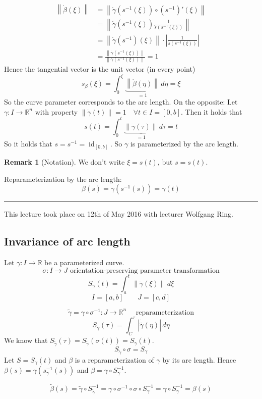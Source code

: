 \documentclass[a4paper,landscape,twocolumn]{article}
\theoremstyle{definition}
\newtheorem{rem}{Remark}
\newcommand\abs[1]{\left|#1\right|}
\newcommand\meta[3]{\hrule{} This #1 took place on #2 with lecturer #3.\par}
\newcommand\norm[1]{\left\|#1\right\|}
\begin{document}
\begin{align*}
  \norm{\dot\beta(\xi)}
    &= \norm{\dot\gamma(s^{-1}(\xi)) \circ (s^{-1})'(\xi)} \\
    &= \norm{\dot\gamma(s^{-1}(\xi)) \frac{1}{\dot{s}(s^{-1}(\xi))}} \\
    &= \norm{\dot\gamma(s^{-1})(\xi)} \cdot \abs{\frac{1}{\dot{s} (s^{-1}(\xi))}} \\
    &= \frac{\norm{\dot{\gamma}(s^{-1}(\xi))}}{\norm{\dot\gamma(s^{-1}(\xi))}} = 1
\end{align*}
Hence the tangential vector is the unit vector (in every point)
\[ s_{\beta}(\xi) = \int_0^{\xi} \underbrace{\norm{\dot\beta(\eta)}}_{=1} \, d\eta = \xi \]
So the curve parameter corresponds to the arc length.
On the opposite: Let $\gamma: I \to \mathbb R^n$ with property $\norm{\dot\gamma(t)} = 1 \quad\forall t \in I = [0,b]$.
Then it holds that
\[ s(t) = \int_0^t \underbrace{\norm{\dot\gamma(\tau)}}_{=1} \, d\tau = t \]
So it holds that $s = s^{-1} = \operatorname{id}_{[0,b]}$.
So $\gamma$ is parameterized by the arc length.

\begin{rem}[Notation]
  We don't write $\xi = s(t)$, but $s = s(t)$.
\end{rem}

Reparameterization by the arc length:
\[ \beta(s) = \gamma(s^{-1}(s)) = \gamma(t) \]

\meta{lecture}{12th of May 2016}{Wolfgang Ring}

\subsection{Invariance of arc length}
%
Let $\gamma: I \to \mathbb R$ be a parameterized curve.
\[ \sigma: I \to J \text{ orientation-preserving parameter transformation} \]
\[ S_\gamma(t) = \int_a^t \norm{\dot\gamma(\xi)} \, d\xi \]
\[ I = [a,b] \qquad J = [c,d] \]

\[ \tilde{\gamma} = \gamma \circ \sigma^{-1}: J \to \mathbb R^n \quad \text{ reparameterization} \]
\[ S_{\tilde{\gamma}}(\tau) = \int_C^\tau \abs{\dot{\tilde{\gamma}}(\eta)} \, d\eta \]
We know that $S_{\tilde{\gamma}}(\tau) = S_{\tilde{\gamma}}(\sigma(t)) = S_{\gamma}(t)$.
\[ S_{\tilde{\gamma}} \circ \sigma = S_{\gamma} \]
Let $S = S_{\gamma}(t)$ and $\beta$ is a reparameterization of $\gamma$ by its arc length.
Hence $\beta(s) = \gamma(s^{-1}_\gamma(s))$ and $\beta = \gamma \circ S_{\gamma}^{-1}$.

\[ \tilde{\beta}(s) = \tilde{\gamma} \circ S_{\tilde{\gamma}}^{-1} = \gamma \circ \sigma^{-1} \circ \sigma \circ S_{\gamma}^{-1} = \gamma \circ S_{\gamma}^{-1} = \beta(s) \]
\end{document}
